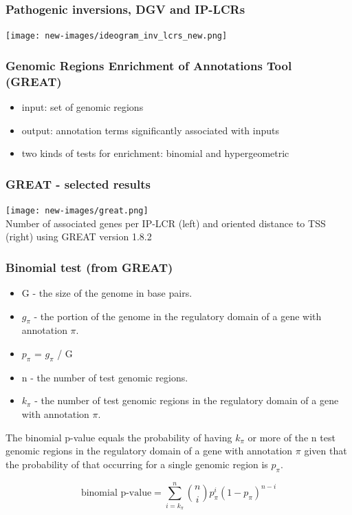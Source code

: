 \begin{frame}\frametitle{Pathogenic inversions, DGV and IP-LCRs}  
	   \texttt{[image: new-images/ideogram\_inv\_lcrs\_new.png]}\\
\end{frame}



\begin{frame}\frametitle{Genomic Regions Enrichment of Annotations Tool (GREAT)}  
\begin{itemize} 
 \item input: set of genomic regions
 \item output: annotation terms significantly associated with inputs
 \item two kinds of tests for enrichment: binomial and hypergeometric
\end{itemize}
\end{frame}


\begin{frame}\frametitle{GREAT - selected results}  
 	   \texttt{[image: new-images/great.png]}\\
\tiny{Number of associated genes per IP-LCR (left) and oriented distance to TSS (right) using GREAT version 1.8.2}
\end{frame}




\begin{frame}\frametitle{Binomial test (from GREAT)}  
\begin{itemize} 
 \item G - the size of the genome in base pairs.
 \item $g_{\pi}$ - the portion of the genome in the regulatory domain of a gene with annotation $\pi$. 
 \item $p_{\pi}$ = $g_{\pi}$ / G  
 \item n - the number of test genomic regions.
 \item $k_{\pi}$ - the number of test genomic regions in the regulatory domain of a gene with annotation $\pi$. 

\end{itemize}
The binomial p-value equals the probability of having $k_{\pi}$ or more of the n test genomic regions in the regulatory domain of a gene with annotation $\pi$ given that the probability of that occurring for a single genomic region is $p_{\pi}$.

$$\text{binomial p-value} = \sum_{i=k_\pi}^{n} {n\choose i}p_\pi^i(1-p_\pi)^{n-i}$$

\end{frame}


